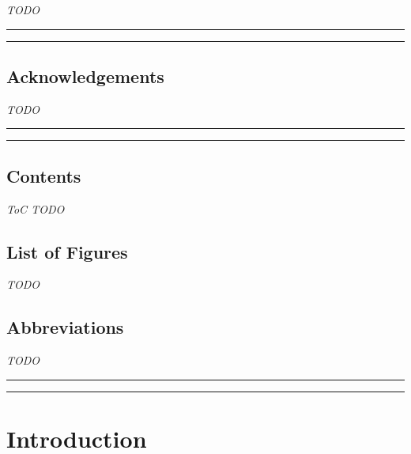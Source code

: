 \documentclass[12pt]{report}
\begin{document}
\emph{TODO}

\begin{center}\rule{0.5\linewidth}{\linethickness}\end{center}

\begin{center}\rule{0.5\linewidth}{\linethickness}\end{center}

\section{Acknowledgements}\label{acknowledgements}

\emph{TODO}

\begin{center}\rule{0.5\linewidth}{\linethickness}\end{center}

\begin{center}\rule{0.5\linewidth}{\linethickness}\end{center}

\section{Contents}\label{contents}

\emph{ToC TODO}

\section{List of Figures}\label{list-of-figures}

\emph{TODO}

\section{Abbreviations}\label{abbreviations}

\emph{TODO}

\begin{center}\rule{0.5\linewidth}{\linethickness}\end{center}

\begin{center}\rule{0.5\linewidth}{\linethickness}\end{center}

{
\setcounter{tocdepth}{3}
\tableofcontents
}

\chapter{Introduction}
\end{document}
